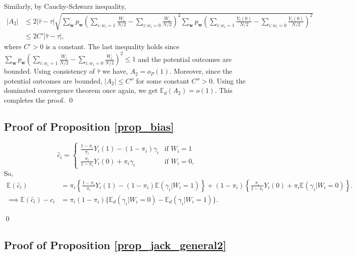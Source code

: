 \documentclass[12pt]{article}
\newcommand{\E}{{\mathbb{E}}}
\begin{document}
Similarly, by Cauchy-Schwarz inequality, 
\begin{align}
|A_2| &\leq 2|\hat{\tau} - \tau|\sqrt{\sum_{\bm{w}}p_{\bm{w}}\left(\sum_{i:w_i = 1}\frac{W_i}{N/2} - \sum_{i:w_i = 0}\frac{W_i}{N/2}\right)^2 \sum_{\bm{w}}p_{\bm{w}}\left(\sum_{i:w_i = 1}\frac{Y_i(0)}{N/2} - \sum_{i:w_i = 0}\frac{Y_i(0)}{N/2}\right)^2} \nonumber \\
& \leq 2C'|\hat{\tau} - \tau|,
\end{align}
where $C'>0$ is a constant. The last inequality holds since $\sum_{\bm{w}}p_{\bm{w}}\left(\sum_{i:w_i = 1}\frac{W_i}{N/2} - \sum_{i:w_i = 0}\frac{W_i}{N/2}\right)^2 \leq 1$ and the potential outcomes are bounded. Using consistency of $\hat{\tau}$ we have, $A_2 = o_P(1)$. Moreover, since the potential outcomes are bounded, $|A_2|\leq C''$ for some constant $C''>0$. Using the dominated convergence theorem once again, we get $\E_d(A_2) = o(1)$. This completes the proof.
\qed


\subsection{Proof of Proposition \ref{prop_bias}}
\begin{equation}
  \hat{c}_i =
    \begin{cases}
      \frac{1-\pi_i}{\pi_i} Y_i(1) - (1-\pi_i)\gamma_i & \text{if $W_i = 1$}\\
    \frac{\pi_i}{1-\pi_i} Y_i(0) + \pi_i\gamma_i & \text{if $W_i = 0$},
    \end{cases}  
\end{equation}
So, 
\begin{align}
\E(\hat{c}_i) &= \pi_i \left\{\frac{1-\pi_i}{\pi_i}Y_i(1) - (1-\pi_i)\E(\gamma_i|W_i = 1) \right\} + (1-\pi_i) \left\{\frac{\pi_i}{1-\pi_i}Y_i(0) + \pi_i\E(\gamma_i|W_i = 0) \right\}. \nonumber\\
\implies \E(\hat{c}_i) - c_i &= \pi_i(1-\pi_i)\{\E_d(\gamma_i|W_i = 0) - \E_d(\gamma_i|W_i = 1)\}.
\end{align}

\qed


\subsection{Proof of Proposition \ref{prop_jack_general2}}
\end{document}
